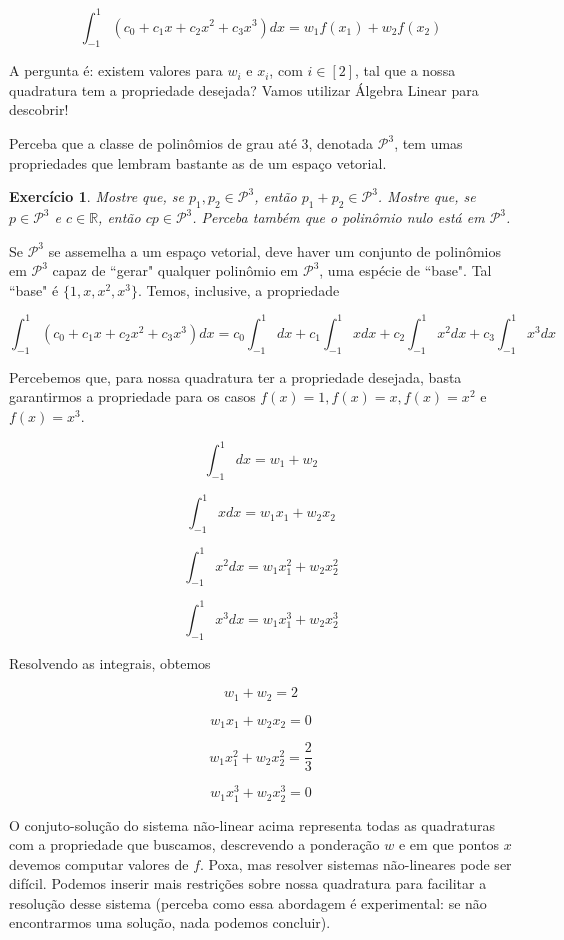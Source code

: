 \documentclass[]{article}
\newtheorem{exercicio}{Exercício}
\numberwithin{equation}{section}
\begin{document}
$$
\int_{-1}^{1} (c_0 + c_1x + c_2x^2 + c_3x^3) dx = w_1 f(x_1) + w_2 f(x_2)
$$

A pergunta é: existem valores para $w_i$ e $x_i$, com $i \in [2]$, tal que a nossa quadratura tem a propriedade desejada? Vamos utilizar Álgebra Linear para descobrir!

Perceba que a classe de polinômios de grau até 3, denotada $\mathcal{P}^3$, tem umas propriedades que lembram bastante as de um espaço vetorial.

\begin{exercicio}
	Mostre que, se $p_1, p_2 \in \mathcal{P}^3$, então $p_1 + p_2 \in \mathcal{P}^3$. Mostre que, se $p \in \mathcal{P}^3$ e $c \in \mathbb{R}$, então $cp \in \mathcal{P}^3$. Perceba também que o polinômio nulo está em $\mathcal{P}^3$.
\end{exercicio}

Se $\mathcal{P}^3$ se assemelha a um espaço vetorial, deve haver um conjunto de polinômios em $\mathcal{P}^3$ capaz de ``gerar" qualquer polinômio em $\mathcal{P}^3$, uma espécie de ``base". Tal ``base" é $\{1, x, x^2, x^3\}$. Temos, inclusive, a propriedade

$$
\int_{-1}^{1} (c_0 + c_1x + c_2x^2 + c_3x^3) dx = c_0\int_{-1}^{1} dx + c_1\int_{-1}^{1} x dx + c_2\int_{-1}^{1} x^2 dx + c_3\int_{-1}^{1} x^3 dx
$$

Percebemos que, para nossa quadratura ter a propriedade desejada, basta garantirmos a propriedade para os casos $f(x) = 1, f(x) = x, f(x) = x^2$ e $f(x) = x^3$.

$$
\int_{-1}^{1} dx = w_1 + w_2
$$

$$
\int_{-1}^{1} x dx = w_1 x_1 + w_2 x_2
$$

$$
\int_{-1}^{1} x^2 dx = w_1 x_1^2 + w_2 x_2^2
$$

$$
\int_{-1}^{1} x^3 dx = w_1 x_1^3 + w_2 x_2^3
$$

Resolvendo as integrais, obtemos

$$
w_1 + w_2 = 2
$$

$$
w_1 x_1 + w_2 x_2 = 0
$$

$$
w_1 x_1^2 + w_2 x_2^2 = \frac{2}{3}
$$

$$
w_1 x_1^3 + w_2 x_2^3 = 0
$$

O conjuto-solução do sistema não-linear acima representa todas as quadraturas com a propriedade que buscamos, descrevendo a ponderação $w$ e em que pontos $x$ devemos computar valores de $f$. Poxa, mas resolver sistemas não-lineares pode ser difícil. Podemos inserir mais restrições sobre nossa quadratura para facilitar a resolução desse sistema (perceba como essa abordagem é experimental: se não encontrarmos uma solução, nada podemos concluir).
\end{document}
